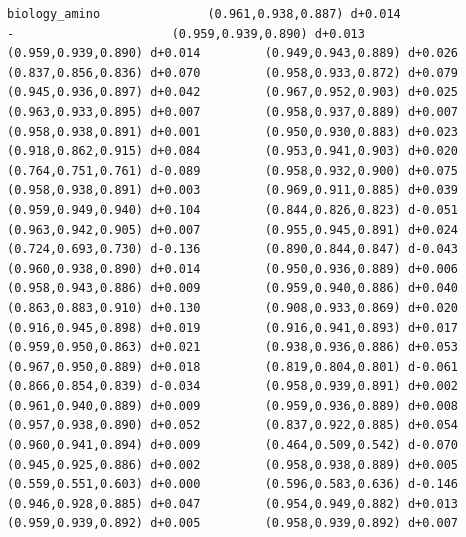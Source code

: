 \documentclass[11pt, letterpaper, openany]{book}
\begin{document}
\begin{empiricalbox}
\begin{lstlisting}[style=terminal]
biology_amino               (0.961,0.938,0.887) d+0.014                      -                      (0.959,0.939,0.890) d+0.013         (0.959,0.939,0.890) d+0.014         (0.949,0.943,0.889) d+0.026         (0.837,0.856,0.836) d+0.070         (0.958,0.933,0.872) d+0.079         (0.945,0.936,0.897) d+0.042         (0.967,0.952,0.903) d+0.025         (0.963,0.933,0.895) d+0.007         (0.958,0.937,0.889) d+0.007         (0.958,0.938,0.891) d+0.001         (0.950,0.930,0.883) d+0.023         (0.918,0.862,0.915) d+0.084         (0.953,0.941,0.903) d+0.020         (0.764,0.751,0.761) d-0.089         (0.958,0.932,0.900) d+0.075         (0.958,0.938,0.891) d+0.003         (0.969,0.911,0.885) d+0.039         (0.959,0.949,0.940) d+0.104         (0.844,0.826,0.823) d-0.051         (0.963,0.942,0.905) d+0.007         (0.955,0.945,0.891) d+0.024         (0.724,0.693,0.730) d-0.136         (0.890,0.844,0.847) d-0.043         (0.960,0.938,0.890) d+0.014         (0.950,0.936,0.889) d+0.006         (0.958,0.943,0.886) d+0.009         (0.959,0.940,0.886) d+0.040         (0.863,0.883,0.910) d+0.130         (0.908,0.933,0.869) d+0.020         (0.916,0.945,0.898) d+0.019         (0.916,0.941,0.893) d+0.017         (0.959,0.950,0.863) d+0.021         (0.938,0.936,0.886) d+0.053         (0.967,0.950,0.889) d+0.018         (0.819,0.804,0.801) d-0.061         (0.866,0.854,0.839) d-0.034         (0.958,0.939,0.891) d+0.002         (0.961,0.940,0.889) d+0.009         (0.959,0.936,0.889) d+0.008         (0.957,0.938,0.890) d+0.052         (0.837,0.922,0.885) d+0.054         (0.960,0.941,0.894) d+0.009         (0.464,0.509,0.542) d-0.070         (0.945,0.925,0.886) d+0.002         (0.958,0.938,0.889) d+0.005         (0.559,0.551,0.603) d+0.000         (0.596,0.583,0.636) d-0.146         (0.946,0.928,0.885) d+0.047         (0.954,0.949,0.882) d+0.013         (0.959,0.939,0.892) d+0.005         (0.958,0.939,0.892) d+0.007     

\end{lstlisting}
\end{empiricalbox}
\end{document}
